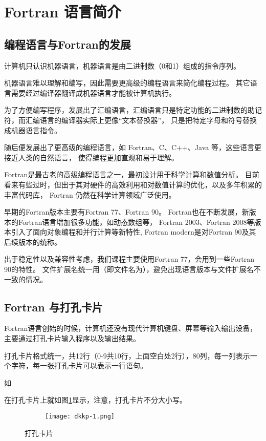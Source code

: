 \newpage
\section{Fortran 语言简介}
\subsection{编程语言与Fortran的发展}
计算机只认识机器语言，机器语言是由二进制数（0和1）组成的指令序列。

机器语言难以理解和编写，因此需要更高级的编程语言来简化编程过程。
其它语言需要经过编译器翻译成机器语言才能被计算机执行。

为了方便编写程序，发展出了汇编语言，汇编语言只是特定功能的二进制数的助记符，而汇编语言的编译器实际上更像“文本替换器”，
只是把特定字母和符号替换成机器语言指令。

随后便发展出了更高级的编程语言，如 Fortran、C、C++、Java 等，这些语言更接近人类的自然语言，
使得编程更加直观和易于理解。

Fortran是最古老的高级编程语言之一，最初设计用于科学计算和数值分析。
目前看来有些过时，但出于其对硬件的高效利用和对数值计算的优化，以及多年积累的丰富代码库，
Fortran 仍然在科学计算领域广泛使用。

早期的Fortran版本主要有Fortran 77、Fortran 90。
Fortran也在不断发展，新版本的Fortran语言增加很多功能，如动态数组等，
Fortran 2003、Fortran 2008等版本引入了面向对象编程和并行计算等新特性,
Fortran modern是对Fortran 90及其后续版本的统称。

出于稳定性以及兼容性考虑，我们课程主要使用Fortran 77，会用到一些Fortran 90的特性。
文件扩展名统一用（即文件名为），避免出现语言版本与文件扩展名不一致的情况。

\subsection{Fortran 与打孔卡片}

Fortran语言创始的时候，计算机还没有现代计算机键盘、屏幕等输入输出设备，主要通过打孔卡片输入程序以及输出结果。

打孔卡片格式统一，共12行（0-9共10行，上面空白处2行），80列，每一列表示一个字符，每一张打孔卡片可以表示一行语句。

如
在打孔卡片上就如图\ref{fig:dkkp-1}显示，注意，打孔卡片不分大小写。
\begin{figure}[h]
    \centering
    \begin{subfigure}[c]{0.9\textwidth}
    \texttt{[image: dkkp-1.png]}
    \end{subfigure}    
    \caption{打孔卡片}
    \label{fig:dkkp-1}
\end{figure}

